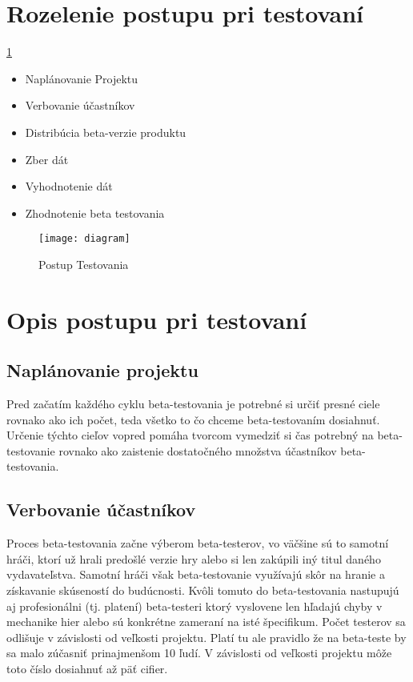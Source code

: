 \documentclass[10pt,twoside,slovak,a4paper]{article}
\begin{document}
\newpage
\section{Rozelenie postupu pri testovaní} \label{postup}\ref{fig:mesh2}

\begin{itemize}
\item Naplánovanie Projektu
\item Verbovanie účastníkov
\item Distribúcia beta-verzie produktu
\item Zber dát
\item Vyhodnotenie dát
\item Zhodnotenie beta testovania
\end{itemize}

\begin{figure}[h]
    \centering
    \texttt{[image: diagram]}
    \caption{Postup Testovania}
    \label{fig:mesh2}
\end{figure}

\section{Opis postupu pri testovaní \cite{Process}} \label{opis}

\subsection{Naplánovanie projektu}
Pred začatím každého cyklu beta-testovania je potrebné si určiť presné ciele rovnako ako ich počet, teda všetko to čo chceme beta-testovaním dosiahnuť. Určenie týchto cieľov vopred pomáha tvorcom vymedziť si čas potrebný na beta-testovanie rovnako ako zaistenie dostatočného množstva účastníkov beta-testovania.

\subsection{Verbovanie účastníkov}
Proces beta-testovania začne výberom beta-testerov, vo väčšine sú to samotní hráči, ktorí už hrali predošlé verzie hry alebo si len zakúpili iný titul daného vydavateľstva. Samotní hráči však beta-testovanie využívajú skôr na hranie a získavanie skúseností do budúcnosti. Kvôli tomuto do beta-testovania nastupujú aj profesionálni (tj. platení) beta-testeri ktorý vyslovene len hľadajú chyby v mechanike hier alebo sú konkrétne zameraní na isté špecifikum. Počet testerov sa odlišuje v závislosti od veľkosti projektu. Platí tu ale pravidlo že na beta-teste by sa malo zúčasniť prinajmenšom 10 ľudí. V závislosti od veľkosti projektu môže toto číslo dosiahnuť až päť cifier.
\end{document}
